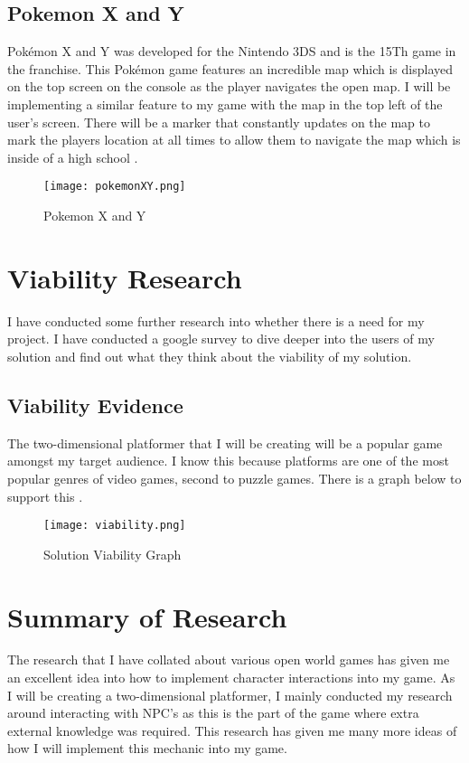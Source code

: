 \documentclass[12pt]{report}
\begin{document}
\pagebreak

\subsection{Pokemon X and Y}
Pokémon X and Y was developed for the Nintendo    
3DS and is the 15Th game in the franchise. This Pokémon game features an incredible map which is displayed on the top screen on the console as the player navigates the open map. I will be implementing a similar feature to my game with the map in the top left of the user’s screen. There will be a marker that constantly updates on the map to mark the players location at all times to allow them to navigate the map which is inside of a high school \cite{pokemonXY}.

\begin{figure}[h]
    \centering
    \texttt{[image: pokemonXY.png]}
    \caption{Pokemon X and Y \cite{pokemonXY}}
    \label{PokemonXnY}
\end{figure}

\clearpage

\section{Viability Research}
I have conducted some further research into whether there is a need for my project. I have conducted a google survey to dive deeper into the users of my solution and find out what they think about the viability of my solution. 

\subsection{Viability Evidence}
The two-dimensional platformer that I will be creating will be a popular game amongst my target audience. I know this because platforms are one of the most popular genres of video games, second to puzzle games. There is a graph below to support this \cite{viabilityG}.

\begin{figure}[ht]
    \centering
    \texttt{[image: viability.png]}
    \caption{Solution Viability Graph \cite{viabilityG}}
    \label{SolutionViabilty}
\end{figure}

\section{Summary of Research}
The research that I have collated about various open world games has given me an excellent idea into how to implement character interactions into my game. As I will be creating a two-dimensional platformer, I mainly conducted my research around interacting with NPC’s as this is the part of the game where extra external knowledge was required. This research has given me many more ideas of how I will implement this mechanic into my game.
\end{document}
